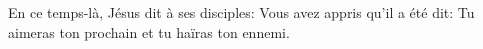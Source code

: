 En ce temps-là, Jésus dit à ses disciples:
	Vous avez appris qu’il a été dit:
	Tu aimeras ton prochain et tu haïras ton ennemi.
